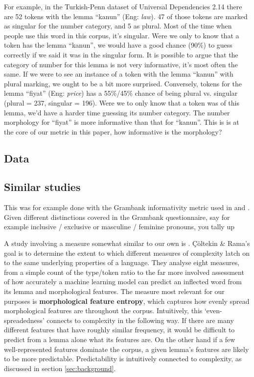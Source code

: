 \documentclass[a4paper]{article}
\begin{document}
For example, in the Turkish-Penn dataset of Universal Dependencies 2.14 there are 52 tokens with the lemma ``kanun'' (Eng: \textit{law}). 47 of those tokens are marked as singular for the number category, and 5 as plural. Most of the time when people use this word in this corpus, it's singular.
Were we only to know that a token has the lemma ``kanun'', we would have a good chance (90\%) to guess correctly if we said it was in the singular form.
It is possible to argue that the category of number for this lemma is not very informative, it's most often the same.
If we were to see an instance of a token with the lemma ``kanun'' with plural marking, we ought to be a bit more surprised.
Conversely, tokens for the lemma ``fiyat'' (Eng: \textit{price}) has a 55\%/45\% chance of being plural vs. singular (plural = 237, singular = 196). Were we to only know that a token was of this lemma, we'd have a harder time guessing its number category. The number morphology for ``fiyat'' is more informative than that for ``kanun''.
This is is at the core of our metric in this paper, how informative is the morphology?



\subsection{Data}
\citet{UD_2.14}

\subsection{Similar studies}

This was for example done with the Grambank informativity metric used in \cite{grambank_release} and \citet{shcherbakova2023societies}. Given different distinctions covered in the Grambank questionnaire, say for example inclusive / exclusive or masculine / feminine pronouns, you tally up 

A study involving a measure somewhat similar to our own is \citet{ccoltekin2023complexity}.
Çöltekin \& Rama's goal is to determine the extent to which different measures of complexity latch on to the same underlying properties of a language.
They analyse eight measures, from a simple count of the type/token ratio to the far more involved assessment of how accurately a machine learning model can predict an inﬂected word from its lemma and morphological features.
The measure most relevant for our purposes is \textbf{morphological feature entropy}, which captures how evenly spread morphological features are throughout the corpus.
Intuitively, this `even-spreadedness' connects to complexity in the following way.
If there are many different features that have roughly similar frequency, it would be difficult to predict from a lemma alone what its features are.
On the other hand if a few well-represented features dominate the corpus, a given lemma's features are likely to be more predictable.
Predictability is intuitively connected to complexity, as discussed in section \ref{sec:background}.
\end{document}

